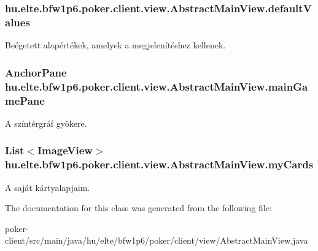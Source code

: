 \subsubsection[{default\+Values}]{ hu.\+elte.\+bfw1p6.\+poker.\+client.\+view.\+Abstract\+Main\+View.\+default\+Values\hspace{0.3cm}{\ttfamily [protected]}}\label{classhu_1_1elte_1_1bfw1p6_1_1poker_1_1client_1_1view_1_1_abstract_main_view_aee1607b1e6452a46e111eb0e41d779cb}
Beégetett alapértékek, amelyek a megjelenítéshez kellenek. \hypertarget{classhu_1_1elte_1_1bfw1p6_1_1poker_1_1client_1_1view_1_1_abstract_main_view_ad9a49e46e49fe5dfb4c4847e961b31cf}{}
\subsubsection[{main\+Game\+Pane}]{\setlength{\rightskip}{0pt plus 5cm}Anchor\+Pane hu.\+elte.\+bfw1p6.\+poker.\+client.\+view.\+Abstract\+Main\+View.\+main\+Game\+Pane\hspace{0.3cm}{\ttfamily [protected]}}\label{classhu_1_1elte_1_1bfw1p6_1_1poker_1_1client_1_1view_1_1_abstract_main_view_ad9a49e46e49fe5dfb4c4847e961b31cf}
A színtérgráf gyökere. \hypertarget{classhu_1_1elte_1_1bfw1p6_1_1poker_1_1client_1_1view_1_1_abstract_main_view_a6fe6f956f6046dde7ee486d65c2fb014}{}
\subsubsection[{my\+Cards}]{\setlength{\rightskip}{0pt plus 5cm}List$<$Image\+View$>$ hu.\+elte.\+bfw1p6.\+poker.\+client.\+view.\+Abstract\+Main\+View.\+my\+Cards\hspace{0.3cm}{\ttfamily [protected]}}\label{classhu_1_1elte_1_1bfw1p6_1_1poker_1_1client_1_1view_1_1_abstract_main_view_a6fe6f956f6046dde7ee486d65c2fb014}
A saját kártyalapjaim. 

The documentation for this class was generated from the following file\+:\begin{DoxyCompactItemize}
\item 
poker-\/client/src/main/java/hu/elte/bfw1p6/poker/client/view/Abstract\+Main\+View.\+java\end{DoxyCompactItemize}
